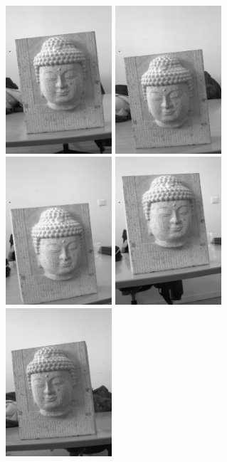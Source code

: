 \begin{figure}
\begin{center}
\includegraphics[height=55mm]{FIGS/Boudhas/IMG_5588.jpg}
\includegraphics[height=55mm]{FIGS/Boudhas/IMG_5589.jpg}
\includegraphics[height=55mm]{FIGS/Boudhas/IMG_5590.jpg}
\includegraphics[height=55mm]{FIGS/Boudhas/IMG_5591.jpg}
\includegraphics[height=55mm]{FIGS/Boudhas/IMG_5592.jpg}

\end{center}
\end{figure}
